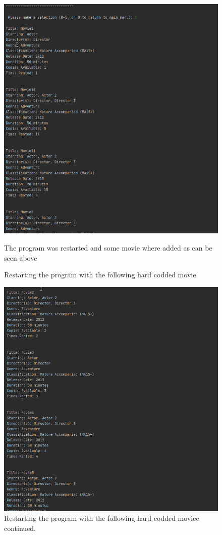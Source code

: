 \documentclass[a4paper,12pt]{article}
\begin{document}
\begin{figure}[!htb]
\centering
\includegraphics[width=1\textwidth]{15}
\caption{Restarting the program with the following hard codded movie}
\medskip
\small
The program was restarted and some movie where added as can be seen above
\end{figure}


\begin{figure}[!htb]
\centering
\includegraphics[width=1\textwidth]{16}
\caption{Restarting the program with the following hard codded moviec continued.}
\medskip
\small
\end{figure}
\end{document}
